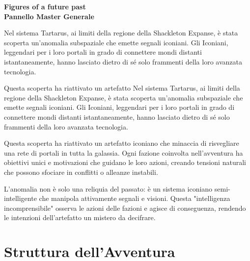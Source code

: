 \documentclass[11pt,a4paper]{article}
\begin{document}
\begin{center}
\Huge\textbf{\textcolor{masterpurple}{Figures of a future past}}\\[0.5cm]
\Large\textbf{Pannello Master Generale}
\end{center}

\begin{tcolorbox}[colback=masterlightpurple!20, colframe=masterpurple, title=\textbf{Premessa Narrativa}]
Nel sistema Tartarus, ai limiti della regione della Shackleton Expanse, è stata scoperta un'anomalia subspaziale che emette segnali iconiani. Gli Iconiani, leggendari per i loro portali in grado di connettere mondi distanti istantaneamente, hanno lasciato dietro di sé solo frammenti della loro avanzata tecnologia.

Questa scoperta ha riattivato un artefatto Nel sistema Tartarus, ai limiti della regione della Shackleton Expanse, è stata scoperta un'anomalia subspaziale che emette segnali iconiani. Gli Iconiani, leggendari per i loro portali in grado di connettere mondi distanti istantaneamente, hanno lasciato dietro di sé solo frammenti della loro avanzata tecnologia.

Questa scoperta ha riattivato un artefatto iconiano che minaccia di risvegliare una rete di portali in tutta la galassia. Ogni fazione coinvolta nell'avventura ha obiettivi unici e motivazioni che guidano le loro azioni, creando tensioni naturali che possono sfociare in conflitti o alleanze instabili.

L'anomalia non è solo una reliquia del passato: è un sistema iconiano semi-intelligente che manipola attivamente segnali e visioni. Questa "intelligenza incomprensibile" osserva le azioni delle fazioni e agisce di conseguenza, rendendo le intenzioni dell'artefatto un mistero da decifrare.
\end{tcolorbox}

\section{Struttura dell'Avventura}
\end{document}
